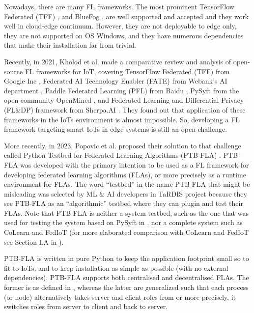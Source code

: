 \documentclass[runningheads]{llncs}
\begin{document}
Nowadays, there are many FL frameworks. The most prominent TensorFlow Federated (TFF) \cite{TensorFlow}, \cite{McMahan2023} and BlueFog \cite{BlueFog}, \cite{ying2021exponential} are well supported and accepted and they work well in cloud-edge continuum. However, they are not deployable to edge only, they are not supported on OS Windows, and they have numerous dependencies that make their installation far from trivial.

Recently, in 2021, Kholod et al. \cite{Kholod2021} made a comparative review and analysis of open-source FL frameworks for IoT, covering TensorFlow Federated (TFF) from Google Inc \cite{TensorFlow}, Federated AI Technology Enabler (FATE) from Webank’s AI department \cite{IGFLF}, Paddle Federated Learning (PFL) from Baidu \cite{DLP}, PySyft from the open community OpenMined \cite{openmined}, and Federated Learning and Differential Privacy (FL\&DP) framework from Sherpa.AI \cite{PrivPresAI}. They found out that application of these frameworks in the IoTs environment is almost impossible. So, developing a FL framework targeting smart IoTs in edge systems is still an open challenge.

More recently, in 2023, Popovic et al. proposed their solution to that challenge called Python Testbed for Federated Learning Algorithms (PTB-FLA) \cite{PopovicPKDG2023}. PTB-FLA was developed with the primary intention to be used as a FL framework for developing federated learning algorithms (FLAs), or more precisely as a runtime environment for FLAs. The word “testbed” in the name PTB-FLA that might be misleading was selected by ML \& AI developers in TaRDIS project \cite{TaRDIS} because they see PTB-FLA as an “algorithmic” testbed where they can plugin and test their FLAs. Note that PTB-FLA is neither a system testbed, such as the one that was used for testing the system based on PySyft in \cite{ChengXue2021}, nor a complete system such as CoLearn \cite{Feraudo2020} and FedIoT \cite{Zhang2021} (for more elaborated comparison with CoLearn and FedIoT see Section I.A in \cite{PopovicPKDG2023}).

PTB-FLA is written in pure Python to keep the application footprint small so to fit to IoTs, and to keep installation as simple as possible (with no external dependencies). PTB-FLA supports both centralised and decentralised FLAs. The former is as defined in \cite{McMahanMRHA17}, whereas the latter are generalized such that each process (or node) alternatively takes server and client roles from \cite{McMahanMRHA17} or more precisely, it switches roles from server to client and back to server.
\end{document}
